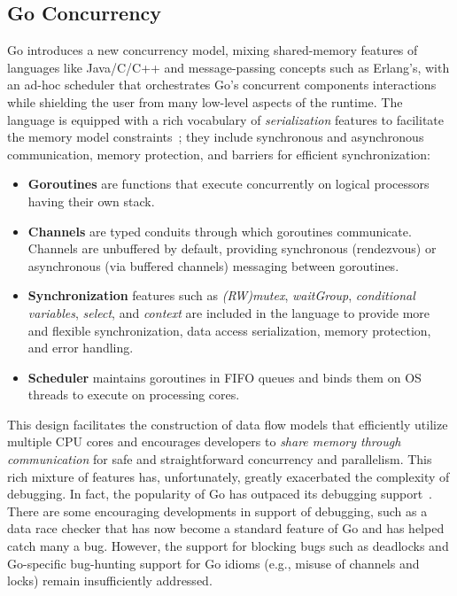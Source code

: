 

%

\subsection{Go Concurrency}
\label{sec:goConcurrency}
%
Go introduces a new concurrency model, mixing shared-memory features of languages like Java/C/C++ and message-passing concepts such as Erlang's, with an ad-hoc scheduler that orchestrates Go's concurrent components interactions while shielding the user from many low-level aspects of the runtime.
%
The language is equipped with a rich vocabulary of \textit{serialization} features to facilitate the memory model constraints~\cite{go-memModel}; they include synchronous and asynchronous communication, memory protection, and barriers for efficient synchronization:
\begin{itemize}
    \item \textbf{Goroutines} are functions that execute concurrently on logical processors having their own stack.
    \item \textbf{Channels} are typed conduits through which goroutines communicate.  Channels are unbuffered by default, providing synchronous (rendezvous) or asynchronous (via buffered channels) messaging between goroutines.
    \item \textbf{Synchronization} features such as \textit{(RW)mutex}, \textit{waitGroup}, \textit{conditional variables}, \textit{select}, and \textit{context} are included in the language to provide more and flexible synchronization, data access serialization, memory protection, and error handling.
    \item \textbf{Scheduler} maintains goroutines in FIFO queues and binds them on OS threads to execute on processing cores.
\end{itemize}


This design facilitates the construction of data flow models that efficiently utilize multiple CPU cores and encourages developers to \textit{share memory through communication} for safe and straightforward concurrency and parallelism.
%
This rich mixture of features has, unfortunately, greatly exacerbated the complexity of debugging.
%
In fact, the popularity of Go has outpaced its debugging support~\cite{go-survey,tu-concurrentBugs-asplos19,yuan-gobench-cgo21}.
%
There are some encouraging developments in support of debugging, such as a data race checker \cite{go-race-blog} that has now become a standard feature of Go and has helped catch many a bug.
%
However, the support for blocking bugs such as deadlocks and Go-specific bug-hunting support for Go idioms (e.g., misuse of channels and locks) remain insufficiently addressed.



